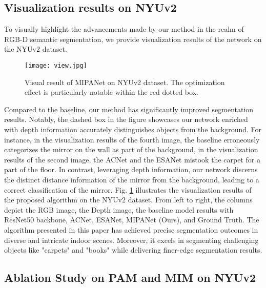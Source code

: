 \documentclass{aims}
\numberwithin{equation}{section}
\begin{document}
\subsection{Visualization results on NYUv2}

To visually highlight the advancements made by our method in the realm of RGB-D semantic segmentation, we provide visualization results of the network on the NYUv2 dataset. 
\begin{figure}[!htb]
	\centering
\texttt{[image: view.jpg]}
\caption{Visual result of MIPANet on NYUv2 dataset. The optimization effect is particularly notable within the red dotted box.\label{fig:view}}
\end{figure}
Compared to the baseline, our method has significantly improved segmentation results. Notably, the dashed box in the figure showcases our network enriched with depth information accurately distinguishes objects from the background. For instance, in the visualization results of the fourth image, the baseline erroneously categorizes the mirror on the wall as part of the background, in the visualization results of the second image, the ACNet and the ESANet mistook the carpet for a part of the floor. In contrast, leveraging depth information, our network discerns the distinct distance information of the mirror from the background, leading to a correct classification of the mirror. Fig. \ref{fig:view} illustrates the visualization results of the proposed algorithm on the NYUv2 dataset. From left to right, the columns depict the RGB image, the Depth image, the baseline model results with ResNet50 backbone, ACNet, ESANet, MIPANet (Ours), and Ground Truth. The algorithm presented in this paper has achieved precise segmentation outcomes in diverse and intricate indoor scenes. Moreover, it excels in segmenting challenging objects like "carpets" and "books" while delivering finer-edge segmentation results.

\subsection{Ablation Study on PAM and MIM on NYUv2}
\end{document}

